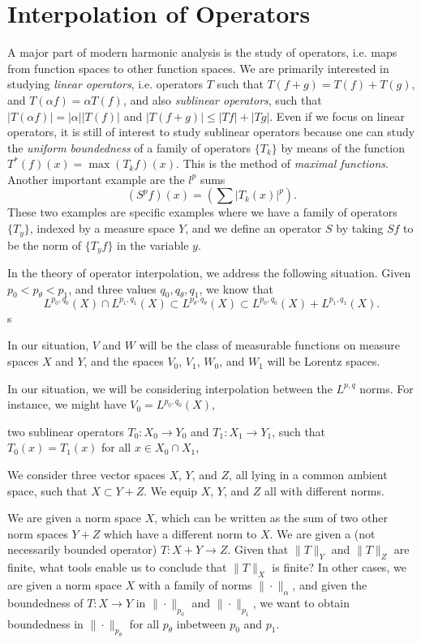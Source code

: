 \section{Interpolation of Operators}

A major part of modern harmonic analysis is the study of operators, i.e. maps from function spaces to other function spaces. We are primarily interested in studying \emph{linear operators}, i.e. operators $T$ such that $T(f + g) = T(f) + T(g)$, and $T(\alpha f) = \alpha T(f)$, and also \emph{sublinear operators}, such that $|T(\alpha f)| = |\alpha| |T(f)|$ and $|T(f + g)| \leq |Tf| + |Tg|$. Even if we focus on linear operators, it is still of interest to study sublinear operators because one can study the \emph{uniform boundedness} of a family of operators $\{ T_k \}$ by means of the function $T^*(f)(x) = \max (T_k f)(x)$. This is the method of \emph{maximal functions}. Another important example are the $l^p$ sums
%
\[ (S^p f)(x) = \left( \sum |T_k(x)|^p \right). \]
%
These two examples are specific examples where we have a family of operators $\{ T_y \}$, indexed by a measure space $Y$, and we define an operator $S$ by taking $Sf$ to be the norm of $\{ T_y f \}$ in the variable $y$.

In the theory of operator interpolation, we address the following situation. Given $p_0 < p_\theta < p_1$, and three values $q_0,q_\theta,q_1$, we know that
%
\[ L^{p_0,q_0}(X) \cap L^{p_1,q_1}(X) \subset L^{p_\theta,q_\theta}(X) \subset L^{p_0,q_0}(X) + L^{p_1,q_1}(X). \]
%
s


In our situation, $V$ and $W$ will be the class of measurable functions on measure spaces $X$ and $Y$, and the spaces $V_0$, $V_1$, $W_0$, and $W_1$ will be Lorentz spaces.

In our situation, we will be considering interpolation between the $L^{p,q}$ norms. For instance, we might have $V_0 = L^{p_0,q_0}(X)$, 

two sublinear operators $T_0: X_0 \to Y_0$ and $T_1: X_1 \to Y_1$, such that $T_0(x) = T_1(x)$ for all $x \in X_0 \cap X_1$,

We consider three vector spaces $X$, $Y$, and $Z$, all lying in a common ambient space, such that $X \subset Y + Z$. We equip $X$, $Y$, and $Z$ all with different norms.

We are given a norm space $X$, which can be written as the sum of two other norm spaces $Y + Z$ which have a different norm to $X$. We are given a (not necessarily bounded operator) $T: X + Y \to Z$. Given that $\| T \|_Y$ and $\| T \|_Z$ are finite, what tools enable us to conclude that $\| T \|_X$ is finite? In other cases, we are given a norm space $X$ with a family of norms $\| \cdot \|_\alpha$, and given the boundedness of $T: X \to Y$ in $\| \cdot \|_{p_0}$ and $\| \cdot \|_{p_1}$, we want to obtain boundedness in $\| \cdot \|_{p_\theta}$ for all $p_\theta$ inbetween $p_0$ and $p_1$.

